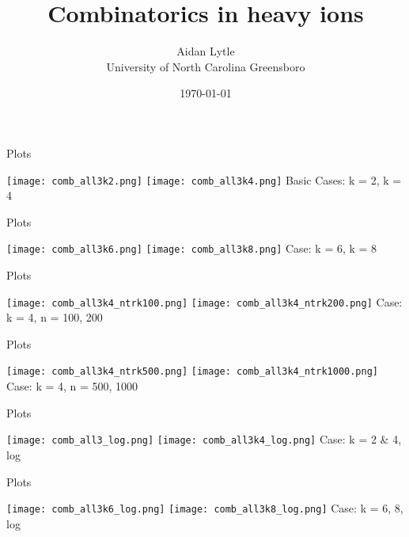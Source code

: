 \documentclass[aspectratio=169,compress,10pt]{beamer} %
\title[\today~-~Slide \insertframenumber]{Combinatorics in heavy ions}
\author[UNCG]{Aidan Lytle \\ University of North Carolina Greensboro}
\date{\today}
\begin{document}
\begin{frame}
\titlepage
\end{frame}





\begin{frame}{Plots}
\begin{adjustwidth}{-2em}{-2em}
\texttt{[image: comb\_all3k2.png]}
\texttt{[image: comb\_all3k4.png]}
Basic Cases: k = 2, k = 4
\end{adjustwidth}
\end{frame}

\begin{frame}{Plots}
\begin{adjustwidth}{-2em}{-2em}
\texttt{[image: comb\_all3k6.png]}
\texttt{[image: comb\_all3k8.png]}
Case: k = 6, k = 8
\end{adjustwidth}
\end{frame}

\begin{frame}{Plots}
\begin{adjustwidth}{-2em}{-2em}
\texttt{[image: comb\_all3k4\_ntrk100.png]}
\texttt{[image: comb\_all3k4\_ntrk200.png]}
Case: k = 4, n = 100, 200
\end{adjustwidth}
\end{frame}

\begin{frame}{Plots}
\begin{adjustwidth}{-2em}{-2em}
\texttt{[image: comb\_all3k4\_ntrk500.png]}
\texttt{[image: comb\_all3k4\_ntrk1000.png]}
Case: k = 4, n = 500, 1000
\end{adjustwidth}
\end{frame}

\begin{frame}{Plots}
\begin{adjustwidth}{-2em}{-2em}
\texttt{[image: comb\_all3\_log.png]}
\texttt{[image: comb\_all3k4\_log.png]}
Case: k = 2 \& 4, log
\end{adjustwidth}
\end{frame}

\begin{frame}{Plots}
\begin{adjustwidth}{-2em}{-2em}
\texttt{[image: comb\_all3k6\_log.png]}
\texttt{[image: comb\_all3k8\_log.png]}
Case: k = 6, 8, log
\end{adjustwidth}
\end{frame}
\end{document}
